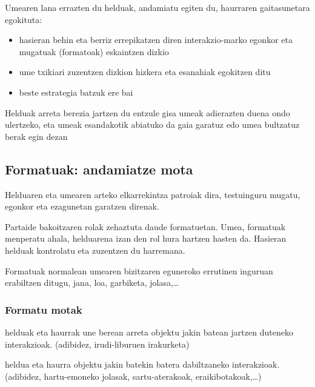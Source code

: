\documentclass[
]{book}
\providecommand{\tightlist}{%
  \setlength{\itemsep}{0pt}\setlength{\parskip}{0pt}}
\begin{document}
Umearen lana errazten du helduak, andamiatu egiten du, haurraren gaitasunetara egokituta:

\begin{itemize}
\tightlist
\item
  hasieran behin eta berriz errepikatzen diren interakzio-marko egonkor eta mugatuak (formatoak) eskaintzen dizkio
\item
  ume txikiari zuzentzen dizkion hizkera eta esanahiak egokitzen ditu
\item
  beste estrategia batzuk ere bai
\end{itemize}

Helduak arreta berezia jartzen du entzule gisa umeak adierazten duena ondo ulertzeko, eta umeak esandakotik abiatuko da gaia garatuz edo umea bultzatuz berak egin dezan

\hypertarget{formatuak-andamiatze-mota}{%
\subsection{Formatuak: andamiatze mota}\label{formatuak-andamiatze-mota}}

Helduaren eta umearen arteko elkarrekintza patroiak dira, testuinguru mugatu, egonkor eta ezagunetan garatzen direnak.

Partaide bakoitzaren rolak zehaztuta daude formatuetan. Umea, formatuak menperatu ahala, helduarena izan den rol hura hartzen hasten da. Hasieran helduak kontrolatu eta zuzentzen du harremana.

Formatuak normalean umearen bizitzaren eguneroko errutinen inguruan erabiltzen ditugu, jana, loa, garbiketa, jolasa,\ldots{}

\hypertarget{formatu-motak}{%
\subsubsection{Formatu motak}\label{formatu-motak}}

\begin{description}
\tightlist
\item[Arreta bateratuko formatuak]
helduak eta haurrak une berean arreta objektu jakin batean jartzen duteneko interakzioak. (adibidez, irudi-liburuen irakurketa)
\item[Ekintza bateratuko formatuak]
heldua eta haurra objektu jakin batekin batera dabiltzaneko interakzioak. (adibidez, hartu-emoneko jolasak, sartu-aterakoak, eraikibotakoak,\ldots)
\end{description}
\end{document}
